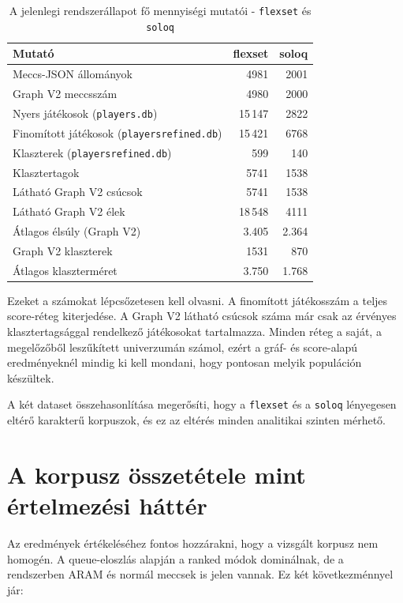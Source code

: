 \begin{table}[H]
\centering
\caption{A jelenlegi rendszerállapot fő mennyiségi mutatói - \texttt{flexset} és \texttt{soloq}}
\begin{tabular}{lrr}
\toprule
\textbf{Mutató} & \textbf{flexset} & \textbf{soloq} \\
\midrule
Meccs-JSON állományok & 4981 & 2001 \\
Graph V2 meccsszám & 4980 & 2000 \\
Nyers játékosok (\texttt{players.db}) & 15\,147 & 2822 \\
Finomított játékosok (\texttt{playersrefined.db}) & 15\,421 & 6768 \\
Klaszterek (\texttt{playersrefined.db}) & 599 & 140 \\
Klasztertagok & 5741 & 1538 \\
Látható Graph V2 csúcsok & 5741 & 1538 \\
Látható Graph V2 élek & 18\,548 & 4111 \\
Átlagos élsúly (Graph V2) & 3.405 & 2.364 \\
Graph V2 klaszterek & 1531 & 870 \\
Átlagos klaszterméret & 3.750 & 1.768 \\
\bottomrule
\end{tabular}
\end{table}

Ezeket a számokat lépcsőzetesen kell olvasni. A finomított játékosszám a teljes score-réteg kiterjedése. A Graph V2 látható csúcsok száma már csak az érvényes klasztertagsággal rendelkező játékosokat tartalmazza. Minden réteg a saját, a megelőzőből leszűkített univerzumán számol, ezért a gráf- és score-alapú eredményeknél mindig ki kell mondani, hogy pontosan melyik populáción készültek.

A két dataset összehasonlítása megerősíti, hogy a \texttt{flexset} és a \texttt{soloq} lényegesen eltérő karakterű korpuszok, és ez az eltérés minden analitikai szinten mérhető.

\section{A korpusz összetétele mint értelmezési háttér}

Az eredmények értékeléséhez fontos hozzárakni, hogy a vizsgált korpusz nem homogén. A queue-eloszlás alapján a ranked módok dominálnak, de a rendszerben ARAM és normál meccsek is jelen vannak. Ez két következménnyel jár:

